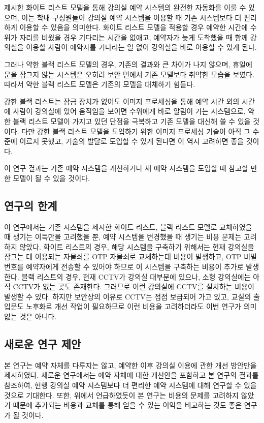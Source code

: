 \documentclass[11pt,a4paper]{article}
\begin{document}
제시한 화이트 리스트 모델을 통해 강의실 예약 시스템의 완전한 자동화를 이룰 수
있으며, 이는 학내 구성원들이 강의실 예약 시스템을 이용할 때 기존 시스템보다 더
편리하게 이용할 수 있음을 의미한다. 화이트 리스트 모델을 적용할 경우 예약한
시간에 수위가 자리를 비웠을 경우 기다리는 시간을 없애고, 예약자가 늦게 도착했을
때 함께 강의실을 이용할 사람이 예약자를 기다리는 일 없이 강의실을 바로 이용할
수 있게 된다.

그러나 약한 블랙 리스트 모델의 경우, 기존의 결과와 큰 차이가 나지 않으며,
휴일에 문을 잠그지 않는 시스템은 오히려 보안 면에서 기존 모델보다 취약한 모습을
보였다. 따라서 약한 블랙 리스트 모델은 기존의 모델을 대체하기 힘들다.

강한 블랙 리스트는 잠금 장치가 없어도 이미지 프로세싱을 통해 예약 시간 외의
시간에 사람이 강의실에 있어 움직임을 보이면 수위에게 바로 알림이 가는
시스템으로, 약한 블랙 리스트 모델이 가지고 있던 단점을 극복하고 기존 모델을
대신해 쓸 수 있을 것이다. 다만 강한 블랙 리스트 모델을 도입하기 위한 이미지
프로세싱 기술이 아직 그 수준에 이르지 못했고, 기술의 발달로 도입할 수 있게
된다면 이 역시 고려하면 좋을 것이다.

이 연구 결과는 기존 예약 시스템을 개선하거나 새 예약 시스템을 도입할 때 참고할
만한 모델이 될 수 있을 것이다.

\subsection{연구의 한계}
이 연구에서는 기존 시스템을 제시한 화이트 리스트, 블랙 리스트 모델로 교체하였을
때 생기는 이득만을 고려했을 뿐, 예약 시스템을 변경했을 때 생기는 비용 문제는
고려하지 않았다.
화이트 리스트의 경우, 해당 시스템을 구축하기 위해서는 현재 강의실을 잠그는 데
이용되는 자물쇠를 OTP 자물쇠로 교체하는데 비용이 발생하고, OTP 비밀번호를
예약자에게 전송할 수 있어야 하므로 이 시스템을 구축하는 비용이 추가로 발생한다.
블랙 리스트의 경우, 현재 CCTV가 강의실 대부분에 있으나, 소형 강의실에는 아직
CCTV가 없는 곳도 존재한다. 그러므로 이런 강의실에 CCTV를 설치하는 비용이 발생할
수 있다.
하지만 보안상의 이유로 CCTV는 점점 보급되어 가고 있고, 교실의 출입문도 노후화로
개선 작업이 필요하므로 이런 비용을 고려하더라도 이번 연구가 의미 없는 것은
아니다.

\subsection{새로운 연구 제안}
본 연구는 예약 자체를 다루지는 않고, 예약한 이후 강의실 이용에 관한 개선
방안만을 제시하였다. 새로운 연구에서는 예약 자체에 대한 개선안을 포함하고 본
연구의 결과를 참조하여, 현행 강의실 예약 시스템보다 더 편리한 예약 시스템에
대해 연구할 수 있을 것으로 기대한다.
또한, 위에서 언급하였듯이 본 연구는 비용의 문제를 고려하지 않았기 때문에
추가되는 비용과 교체를 통해 얻을 수 있는 이익을 비교하는 것도 좋은 연구가 될
것이다.
\end{document}
